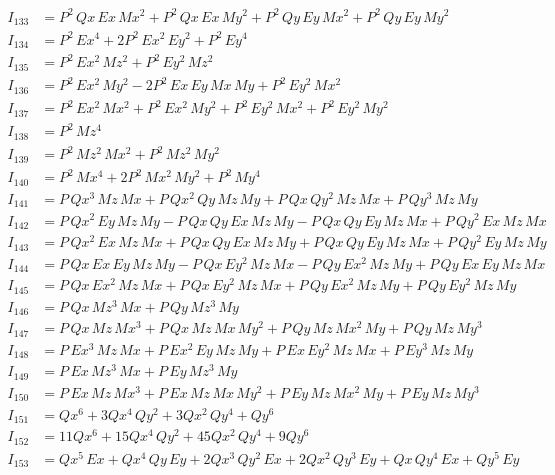 \documentclass{article}
\begin{document}
\begin{align*}
I_{133} &= P^{2}\,Qx\,Ex\,Mx^{2} + P^{2}\,Qx\,Ex\,My^{2} + P^{2}\,Qy\,Ey\,Mx^{2} + P^{2}\,Qy\,Ey\,My^{2} \\
I_{134} &= P^{2}\,Ex^{4} + 2P^{2}\,Ex^{2}\,Ey^{2} + P^{2}\,Ey^{4} \\
I_{135} &= P^{2}\,Ex^{2}\,Mz^{2} + P^{2}\,Ey^{2}\,Mz^{2} \\
I_{136} &= P^{2}\,Ex^{2}\,My^{2} - 2P^{2}\,Ex\,Ey\,Mx\,My + P^{2}\,Ey^{2}\,Mx^{2} \\
I_{137} &= P^{2}\,Ex^{2}\,Mx^{2} + P^{2}\,Ex^{2}\,My^{2} + P^{2}\,Ey^{2}\,Mx^{2} + P^{2}\,Ey^{2}\,My^{2} \\
I_{138} &= P^{2}\,Mz^{4} \\
I_{139} &= P^{2}\,Mz^{2}\,Mx^{2} + P^{2}\,Mz^{2}\,My^{2} \\
I_{140} &= P^{2}\,Mx^{4} + 2P^{2}\,Mx^{2}\,My^{2} + P^{2}\,My^{4} \\
I_{141} &= P\,Qx^{3}\,Mz\,Mx + P\,Qx^{2}\,Qy\,Mz\,My + P\,Qx\,Qy^{2}\,Mz\,Mx + P\,Qy^{3}\,Mz\,My \\
I_{142} &= P\,Qx^{2}\,Ey\,Mz\,My -P\,Qx\,Qy\,Ex\,Mz\,My -P\,Qx\,Qy\,Ey\,Mz\,Mx + P\,Qy^{2}\,Ex\,Mz\,Mx \\
I_{143} &= P\,Qx^{2}\,Ex\,Mz\,Mx + P\,Qx\,Qy\,Ex\,Mz\,My + P\,Qx\,Qy\,Ey\,Mz\,Mx + P\,Qy^{2}\,Ey\,Mz\,My \\
I_{144} &= P\,Qx\,Ex\,Ey\,Mz\,My -P\,Qx\,Ey^{2}\,Mz\,Mx -P\,Qy\,Ex^{2}\,Mz\,My + P\,Qy\,Ex\,Ey\,Mz\,Mx \\
I_{145} &= P\,Qx\,Ex^{2}\,Mz\,Mx + P\,Qx\,Ey^{2}\,Mz\,Mx + P\,Qy\,Ex^{2}\,Mz\,My + P\,Qy\,Ey^{2}\,Mz\,My \\
I_{146} &= P\,Qx\,Mz^{3}\,Mx + P\,Qy\,Mz^{3}\,My \\
I_{147} &= P\,Qx\,Mz\,Mx^{3} + P\,Qx\,Mz\,Mx\,My^{2} + P\,Qy\,Mz\,Mx^{2}\,My + P\,Qy\,Mz\,My^{3} \\
I_{148} &= P\,Ex^{3}\,Mz\,Mx + P\,Ex^{2}\,Ey\,Mz\,My + P\,Ex\,Ey^{2}\,Mz\,Mx + P\,Ey^{3}\,Mz\,My \\
I_{149} &= P\,Ex\,Mz^{3}\,Mx + P\,Ey\,Mz^{3}\,My \\
I_{150} &= P\,Ex\,Mz\,Mx^{3} + P\,Ex\,Mz\,Mx\,My^{2} + P\,Ey\,Mz\,Mx^{2}\,My + P\,Ey\,Mz\,My^{3} \\
I_{151} &= Qx^{6} + 3Qx^{4}\,Qy^{2} + 3Qx^{2}\,Qy^{4} + Qy^{6} \\
I_{152} &= 11Qx^{6} + 15Qx^{4}\,Qy^{2} + 45Qx^{2}\,Qy^{4} + 9Qy^{6} \\
I_{153} &= Qx^{5}\,Ex + Qx^{4}\,Qy\,Ey + 2Qx^{3}\,Qy^{2}\,Ex + 2Qx^{2}\,Qy^{3}\,Ey + Qx\,Qy^{4}\,Ex + Qy^{5}\,Ey \\

\end{align*}
\end{document}
